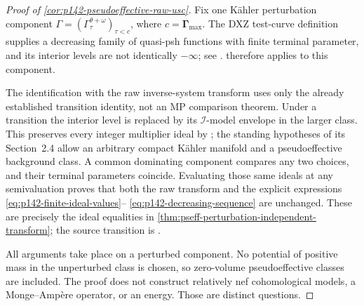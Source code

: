 \begin{proof}[Proof of \cref{cor:p142-pseudoeffective-raw-usc}]
Fix one K\"ahler perturbation component
$\Gamma=(\Gamma^{\theta+\omega}_\tau)_{\tau<c}$, where
$c=\boldsymbol\Gamma_{\max}$. The DXZ test-curve definition supplies
a decreasing family of quasi-psh functions with finite terminal
parameter, and its interior levels are not identically $-\infty$;
see \cite[Section~2.2, Definition~3.3]{DXZ23}.
 therefore applies to this component.

The identification with the raw inverse-system transform uses only the
already established transition identity, not an MP comparison theorem.
Under a transition the interior level is replaced by its
$\mathcal I$-model envelope in the larger class. This preserves every
integer multiplier ideal by \cite[Proposition~2.18(ii)]{DX22}; the
standing hypotheses of its Section~2.4 allow an arbitrary compact
K\"ahler manifold and a pseudoeffective background class. A common
dominating component compares any
two choices, and their terminal parameters coincide. Evaluating those
same ideals at any semivaluation proves that both the raw transform and
the explicit expressions \eqref{eq:p142-finite-ideal-values}--
\eqref{eq:p142-decreasing-sequence} are unchanged. These are precisely
the ideal equalities in
\cref{thm:pseff-perturbation-independent-transform}; the source
transition is \cite[formula~(28), Definition~3.3]{DXZ23}.

All arguments take place on a perturbed component. No potential of
positive mass in the unperturbed class is chosen, so zero-volume
pseudoeffective classes are included. The proof does not construct
relatively nef cohomological models, a Monge--Amp\`ere operator, or an
energy. Those are distinct questions.
\end{proof}

